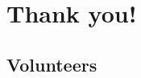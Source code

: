 \documentclass[t]{beamer}
\begin{document}

\section{Thank you!}

\subsection{Volunteers}
\end{document}
